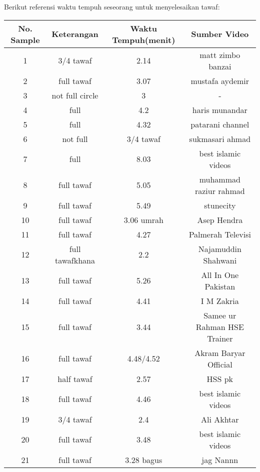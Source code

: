 Berikut referensi waktu tempuh seseorang untuk menyelesaikan tawaf:
\begin{table}[H]
\begin{tabular}{|c|c|c|c|}
\hline
No.  Sample & Keterangan & Waktu Tempuh(menit) &Sumber Video\\
\hline
1& 3/4 tawaf&	2.14 &matt zimbo banzai\\
\hline
2&full tawaf&	3.07&mustafa aydemir\\
\hline
3&not full circle&	3&-\\
\hline
4&full&	4.2&haris munandar\\
\hline
5&full&	4.32&patarani channel\\
\hline
6&not full&	3/4 tawaf&sukmasari ahmad\\
\hline
7&full&	8.03&best islamic videos\\
\hline
8&full tawaf&	5.05&muhammad raziur rahmad\\

\hline
9&full tawaf&	5.49&stunecity\\

\hline
10&full tawaf&	3.06 umrah& Asep Hendra\\

\hline
11&full tawaf&	4.27&Palmerah Televisi\\

\hline
12&full tawafkhana&	2.2&Najamuddin Shahwani\\

\hline
13&full tawaf&	5.26&All In One Pakistan\\

\hline
14&full tawaf&4.41& I M Zakria\\

\hline
15&full tawaf&	3.44&Samee ur Rahman HSE Trainer\\

\hline
16&full tawaf&	4.48/4.52&Akram Baryar Official\\

\hline 
17&half tawaf&	2.57&HSS pk\\

\hline
18&full tawaf&	4.46&best islamic videos\\

\hline
19&3/4 tawaf&	2.4&Ali Akhtar\\

\hline
20&full tawaf&	3.48&best islamic videos\\

\hline
21&full tawaf&	3.28 bagus& jag Nannn\\


\end{tabular}
\end{table}
